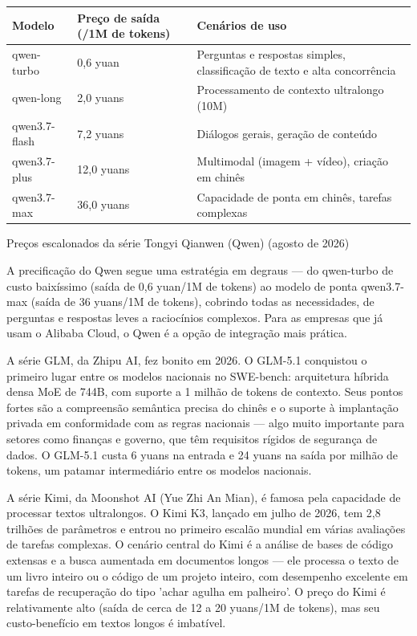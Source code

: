 \begin{center}
\begin{tabularx}{\linewidth}{|X|X|X|}
\hline
\textbf{Modelo} & \textbf{Preço de saída (/1M de tokens)} & \textbf{Cenários de uso} \tabularnewline
\hline
qwen-turbo & 0,6 yuan & Perguntas e respostas simples, classificação de texto e alta concorrência \tabularnewline
qwen-long & 2,0 yuans & Processamento de contexto ultralongo (10M) \tabularnewline
qwen3.7-flash & 7,2 yuans & Diálogos gerais, geração de conteúdo \tabularnewline
qwen3.7-plus & 12,0 yuans & Multimodal (imagem + vídeo), criação em chinês \tabularnewline
qwen3.7-max & 36,0 yuans & Capacidade de ponta em chinês, tarefas complexas \tabularnewline
\hline
\end{tabularx}
\end{center}

\begin{center}\small\color{gray}Preços escalonados da série Tongyi Qianwen (Qwen) (agosto de 2026)\end{center}

A precificação do Qwen segue uma estratégia em degraus — do qwen-turbo de custo baixíssimo (saída de 0,6 yuan/1M de tokens) ao modelo de ponta qwen3.7-max (saída de 36 yuans/1M de tokens), cobrindo todas as necessidades, de perguntas e respostas leves a raciocínios complexos. Para as empresas que já usam o Alibaba Cloud, o Qwen é a opção de integração mais prática.


A série GLM, da Zhipu AI, fez bonito em 2026. O GLM-5.1 conquistou o primeiro lugar entre os modelos nacionais no SWE-bench: arquitetura híbrida densa MoE de 744B, com suporte a 1 milhão de tokens de contexto. Seus pontos fortes são a compreensão semântica precisa do chinês e o suporte à implantação privada em conformidade com as regras nacionais — algo muito importante para setores como finanças e governo, que têm requisitos rígidos de segurança de dados. O GLM-5.1 custa 6 yuans na entrada e 24 yuans na saída por milhão de tokens, um patamar intermediário entre os modelos nacionais.


A série Kimi, da Moonshot AI (Yue Zhi An Mian), é famosa pela capacidade de processar textos ultralongos. O Kimi K3, lançado em julho de 2026, tem 2,8 trilhões de parâmetros e entrou no primeiro escalão mundial em várias avaliações de tarefas complexas. O cenário central do Kimi é a análise de bases de código extensas e a busca aumentada em documentos longos — ele processa o texto de um livro inteiro ou o código de um projeto inteiro, com desempenho excelente em tarefas de recuperação do tipo 'achar agulha em palheiro'. O preço do Kimi é relativamente alto (saída de cerca de 12 a 20 yuans/1M de tokens), mas seu custo-benefício em textos longos é imbatível.

